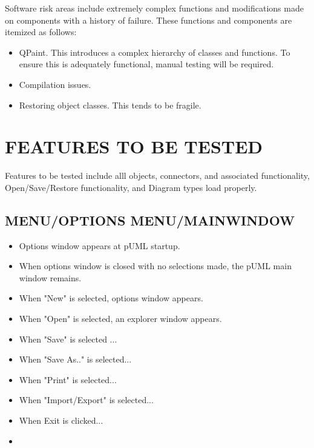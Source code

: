 \documentclass[twoside,letterpaper]{article}
\begin{document}
Software risk areas include extremely complex functions and modifications made on components with a history of failure. These functions and components are itemized as follows: 
\begin{itemize}
\item   QPaint. This introduces a complex hierarchy of classes and functions. To ensure this is adequately functional, manual testing will be required.
\item   Compilation issues.
\item   Restoring object classes. This tends to be fragile.
\end{itemize}


\section[FEATURES TO BE TESTED]{\bfseries FEATURES TO BE TESTED} 

Features to be tested include alll objects, connectors, and associated functionality, Open/Save/Restore functionality, and Diagram types load properly.


\subsection[MENU/OPTIONS MENU/MAINWINDOW]{\bfseries MENU/OPTIONS MENU/MAINWINDOW} 

\begin{itemize}
\item Options window appears at pUML startup.
\item When options window is closed with no selections made, the pUML main window remains.
\item When "New" is selected, options window appears.
\item When "Open" is selected, an explorer window appears.
\item When "Save" is selected ...
\item When "Save As.." is selected...
\item When "Print" is selected...
\item When "Import/Export" is selected...
\item When Exit is clicked...
\item 
\end{itemize}
\end{document}
